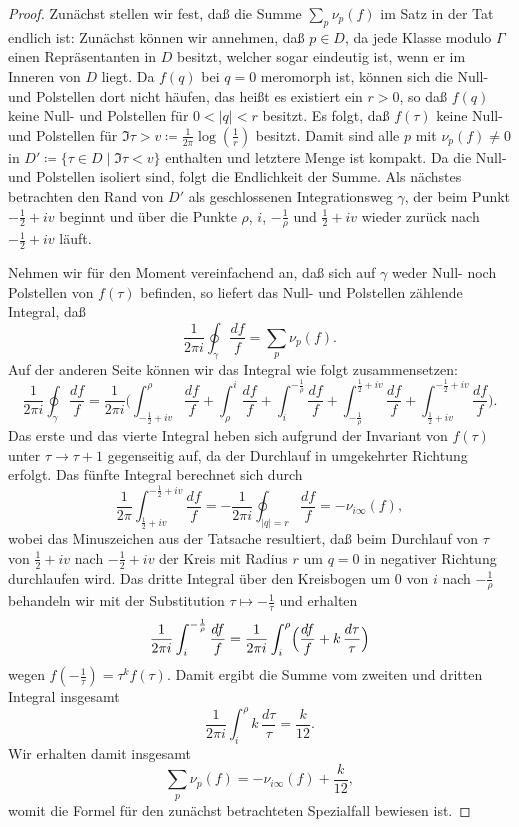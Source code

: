 \documentclass[a4paper,twoside,openright]{report}
\theoremstyle{definition}
\theoremstyle{remark}
\begin{document}
\begin{proof}
  Zunächst stellen wir fest, daß die Summe $\sum_p \nu_p(f)$ im Satz in der
  Tat endlich ist: Zunächst können wir annehmen, daß $p \in D$, da jede Klasse
  modulo $\Gamma$ einen Repräsentanten in $D$ besitzt, welcher sogar eindeutig
  ist, wenn er im Inneren von $D$ liegt.  
  Da $f(q)$ bei $q = 0$ meromorph ist, können sich die
  Null- und Polstellen dort nicht häufen, das heißt es existiert ein $r > 0$,
  so daß $f(q)$ keine Null- und Polstellen für $0 < |q| < r$ besitzt. Es folgt,
  daß $f(\tau)$ keine Null- und Polstellen für $\Im \tau > v \coloneqq \frac 1{2 \pi} \log(\frac 1 r)$
  besitzt. Damit sind alle $p$ mit $\nu_p(f) \neq 0$ in $D' \coloneqq \{\tau \in D\mid \Im \tau < v\}$
  enthalten und letztere Menge ist kompakt. Da die Null- und Polstellen isoliert
  sind, folgt die Endlichkeit der Summe. Als nächstes betrachten den Rand von $D'$
  als geschlossenen Integrationsweg $\gamma$, der beim Punkt $-\frac 1 2 + i v$
  beginnt und über die Punkte $\rho$, $i$, $-\frac 1\rho$ und $\frac 1 2 + iv$
  wieder zurück nach $-\frac 1 2 + iv$ läuft.
  
  Nehmen wir für den Moment vereinfachend an, daß sich auf $\gamma$ weder Null-
  noch Polstellen von $f(\tau)$ befinden, so liefert das Null- und Polstellen zählende
  Integral, daß
  \[
    \frac 1 {2 \pi i} \oint_\gamma \frac{df}{f}    %
    = \sum_p \nu_p(f).
  \]
  Auf der anderen Seite können wir das Integral wie folgt zusammensetzen:
  \[
    \frac 1 {2 \pi i} \oint_\gamma \frac{df} f =
    \frac 1 {2\pi i} \Biggl(\int_{- \frac 1 2 + iv}^\rho \frac{df}f + \int_\rho^i \frac{df}f
    + \int_i^{-\frac 1 \rho} \frac{df}f + \int_{-\frac 1\rho}^{\frac 1 2 + i v} \frac{df}f
    + \int_{\frac 1 2 + i v}^{-\frac 1 2 + i v} \frac{df} f\Biggr).
  \]
  Das erste und das vierte Integral heben sich aufgrund der Invariant von $f(\tau)$
  unter $\tau \to \tau + 1$ gegenseitig auf, da der Durchlauf in umgekehrter
  Richtung erfolgt. Das fünfte Integral berechnet sich durch
  \[
    \frac 1 {2\pi} \int_{\frac 1 2 + iv}^{-\frac 1 2 + iv} \frac{df} f
    = - \frac 1{2 \pi i} \oint_{|q| = r} \frac{df} f = - \nu_{i\infty}(f),
  \]  
  wobei das Minuszeichen aus der Tatsache resultiert, daß beim Durchlauf von
  $\tau$ von $\frac 1 2 + iv$ nach $-\frac 1 2 + iv$ der Kreis mit Radius $r$
  um $q = 0$ in negativer Richtung durchlaufen wird.
  Das dritte Integral über den Kreisbogen um $0$ von $i$ nach $-\frac 1\rho$
  behandeln wir mit der Substitution $\tau \mapsto - \frac 1\tau$ und erhalten
  \[
    \frac 1{2\pi i} \int_i^{-\frac 1 \rho} \frac{df} f
    = \frac 1{2\pi i} \int_i^\rho \Bigl(\frac{df} f + k \, \frac{d\tau}{\tau}\Bigr)
  \]
  wegen $f(-\frac 1\tau) = \tau^k f(\tau)$. Damit ergibt die Summe vom zweiten
  und dritten Integral insgesamt
  \[
    \frac 1{2\pi i} \int_i^\rho k \, \frac{d\tau}{\tau} = \frac k{12}.
  \]
  Wir erhalten damit insgesamt
  \[
    \sum_p \nu_p(f) = -\nu_{i\infty}(f) + \frac k{12},
  \]
  womit die Formel für den zunächst betrachteten Spezialfall bewiesen ist.
  

\end{proof}
\end{document}
